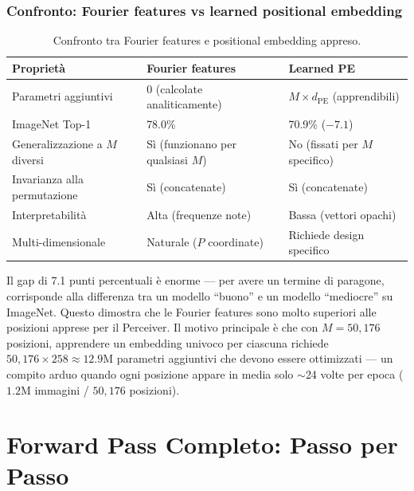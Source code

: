 \documentclass[12pt,a4paper]{article}
\begin{document}
\subsubsection{Confronto: Fourier features vs learned positional embedding} \label{sec:ff_vs_learned}

\begin{table}[htbp]
\centering
\caption{Confronto tra Fourier features e positional embedding appreso.}
\begin{tabular}{@{}p{3.5cm}p{5cm}p{5cm}@{}}
\toprule
\textbf{Propriet\`a} & \textbf{Fourier features} & \textbf{Learned PE} \\
\midrule
Parametri aggiuntivi & 0 (calcolate analiticamente) & $M \times d_{\text{PE}}$ (apprendibili) \\
ImageNet Top-1 & 78.0\% & 70.9\% ($-7.1$) \\
Generalizzazione a $M$ diversi & S\`i (funzionano per qualsiasi $M$) & No (fissati per $M$ specifico) \\
Invarianza alla permutazione & S\`i (concatenate) & S\`i (concatenate) \\
Interpretabilit\`a & Alta (frequenze note) & Bassa (vettori opachi) \\
Multi-dimensionale & Naturale ($P$ coordinate) & Richiede design specifico \\
\bottomrule
\end{tabular}
\end{table}

Il gap di 7.1 punti percentuali \`e enorme --- per avere un termine di paragone, corrisponde alla differenza tra un modello ``buono'' e un modello ``mediocre'' su ImageNet. Questo dimostra che le Fourier features sono molto superiori alle posizioni apprese per il Perceiver. Il motivo principale \`e che con $M = 50{,}176$ posizioni, apprendere un embedding univoco per ciascuna richiede $50{,}176 \times 258 \approx 12.9$M parametri aggiuntivi che devono essere ottimizzati --- un compito arduo quando ogni posizione appare in media solo $\sim$24 volte per epoca ($1.2$M immagini / $50{,}176$ posizioni).


\newpage
\section{Forward Pass Completo: Passo per Passo} \label{sec:forward}
\end{document}

